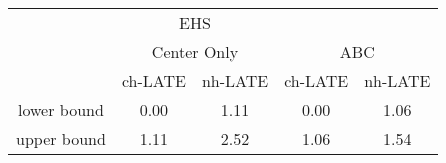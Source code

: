 \begin{tabular}{ccccc}
\toprule 
\midrule 
 & \multicolumn{2}{c}{EHS} & \multicolumn{2}{c}{} \\
 & \multicolumn{2}{c}{Center Only} & \multicolumn{2}{c}{ABC} \\
 \cmidrule(lr){2-3} \cmidrule(lr){4-5} 
 & ch-LATE & nh-LATE & ch-LATE & nh-LATE \\
\midrule 
lower bound & 0.00 & 1.11 & 0.00 & 1.06 \\
upper bound & 1.11 & 2.52 & 1.06 & 1.54 \\
\midrule 
\bottomrule 
\end{tabular}
